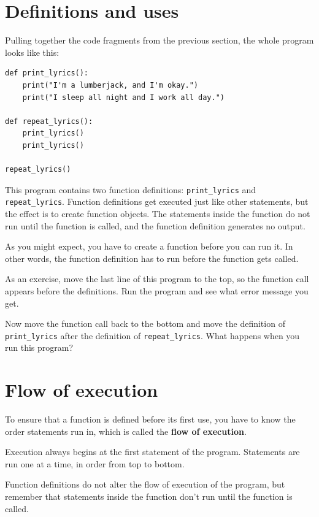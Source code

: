 \documentclass[10pt]{book}
\begin{document}
\section{Definitions and uses}

Pulling together the code fragments from the previous section, the
whole program looks like this:

\begin{verbatim}
def print_lyrics():
    print("I'm a lumberjack, and I'm okay.")
    print("I sleep all night and I work all day.")

def repeat_lyrics():
    print_lyrics()
    print_lyrics()

repeat_lyrics()
\end{verbatim}
%
This program contains two function definitions: \verb"print_lyrics" and
\verb"repeat_lyrics".  Function definitions get executed just like other
statements, but the effect is to create function objects.  The statements
inside the function do not run until the function is called, and
the function definition generates no output.

As you might expect, you have to create a function before you can
run it.  In other words, the function definition has to run
before the function gets called.

As an exercise, move the last line of this program
to the top, so the function call appears before the definitions. Run
the program and see what error
message you get.

Now move the function call back to the bottom
and move the definition of \verb"print_lyrics" after the definition of
\verb"repeat_lyrics".  What happens when you run this program?


\section{Flow of execution}

To ensure that a function is defined before its first use,
you have to know the order statements run in, which is
called the {\bf flow of execution}.

Execution always begins at the first statement of the program.
Statements are run one at a time, in order from top to bottom.

Function definitions do not alter the flow of execution of the
program, but remember that statements inside the function don't
run until the function is called.
\end{document}
